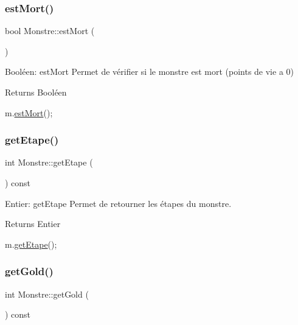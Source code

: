 \subsubsection{\texorpdfstring{est\+Mort()}{estMort()}}
{\footnotesize\ttfamily bool Monstre\+::est\+Mort (\begin{DoxyParamCaption}{ }\end{DoxyParamCaption})}



Booléen\+: est\+Mort Permet de vérifier si le monstre est mort (points de vie a 0) 

\begin{DoxyReturn}{Returns}
Booléen 
\begin{DoxyCode}
m.\hyperlink{classMonstre_aebc60bc5dfa1353663ba975c589dc2e3}{estMort}();
\end{DoxyCode}
 
\end{DoxyReturn}
\mbox{\label{classMonstre_a255b98ed4faab15ecd13a315414a5b94}} 
\subsubsection{\texorpdfstring{get\+Etape()}{getEtape()}}
{\footnotesize\ttfamily int Monstre\+::get\+Etape (\begin{DoxyParamCaption}{ }\end{DoxyParamCaption}) const}



Entier\+: get\+Etape Permet de retourner les étapes du monstre. 

\begin{DoxyReturn}{Returns}
Entier 
\begin{DoxyCode}
m.\hyperlink{classMonstre_a255b98ed4faab15ecd13a315414a5b94}{getEtape}();
\end{DoxyCode}
 
\end{DoxyReturn}
\mbox{\label{classMonstre_a4a71cce5e0825e0e331bfdd3538a9b30}} 
\subsubsection{\texorpdfstring{get\+Gold()}{getGold()}}
{\footnotesize\ttfamily int Monstre\+::get\+Gold (\begin{DoxyParamCaption}{ }\end{DoxyParamCaption}) const}



